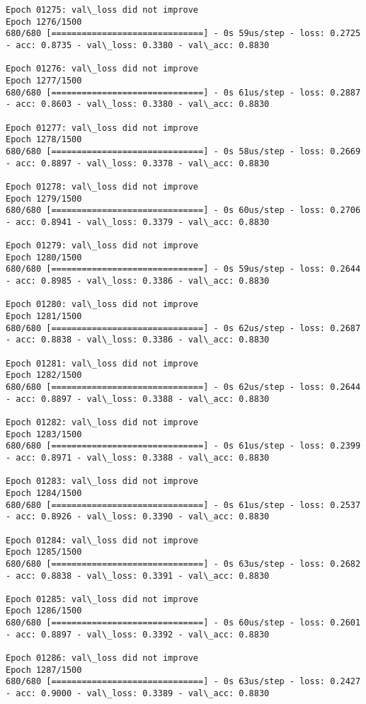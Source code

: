 \documentclass[11pt]{article}
\begin{document}
\begin{Verbatim}[commandchars=\\\{\}]
Epoch 01275: val\_loss did not improve
Epoch 1276/1500
680/680 [==============================] - 0s 59us/step - loss: 0.2725 - acc: 0.8735 - val\_loss: 0.3380 - val\_acc: 0.8830

Epoch 01276: val\_loss did not improve
Epoch 1277/1500
680/680 [==============================] - 0s 61us/step - loss: 0.2887 - acc: 0.8603 - val\_loss: 0.3380 - val\_acc: 0.8830

Epoch 01277: val\_loss did not improve
Epoch 1278/1500
680/680 [==============================] - 0s 58us/step - loss: 0.2669 - acc: 0.8897 - val\_loss: 0.3378 - val\_acc: 0.8830

Epoch 01278: val\_loss did not improve
Epoch 1279/1500
680/680 [==============================] - 0s 60us/step - loss: 0.2706 - acc: 0.8941 - val\_loss: 0.3379 - val\_acc: 0.8830

Epoch 01279: val\_loss did not improve
Epoch 1280/1500
680/680 [==============================] - 0s 59us/step - loss: 0.2644 - acc: 0.8985 - val\_loss: 0.3386 - val\_acc: 0.8830

Epoch 01280: val\_loss did not improve
Epoch 1281/1500
680/680 [==============================] - 0s 62us/step - loss: 0.2687 - acc: 0.8838 - val\_loss: 0.3386 - val\_acc: 0.8830

Epoch 01281: val\_loss did not improve
Epoch 1282/1500
680/680 [==============================] - 0s 62us/step - loss: 0.2644 - acc: 0.8897 - val\_loss: 0.3388 - val\_acc: 0.8830

Epoch 01282: val\_loss did not improve
Epoch 1283/1500
680/680 [==============================] - 0s 61us/step - loss: 0.2399 - acc: 0.8971 - val\_loss: 0.3388 - val\_acc: 0.8830

Epoch 01283: val\_loss did not improve
Epoch 1284/1500
680/680 [==============================] - 0s 61us/step - loss: 0.2537 - acc: 0.8926 - val\_loss: 0.3390 - val\_acc: 0.8830

Epoch 01284: val\_loss did not improve
Epoch 1285/1500
680/680 [==============================] - 0s 63us/step - loss: 0.2682 - acc: 0.8838 - val\_loss: 0.3391 - val\_acc: 0.8830

Epoch 01285: val\_loss did not improve
Epoch 1286/1500
680/680 [==============================] - 0s 60us/step - loss: 0.2601 - acc: 0.8897 - val\_loss: 0.3392 - val\_acc: 0.8830

Epoch 01286: val\_loss did not improve
Epoch 1287/1500
680/680 [==============================] - 0s 63us/step - loss: 0.2427 - acc: 0.9000 - val\_loss: 0.3389 - val\_acc: 0.8830


\end{Verbatim}
\end{document}
